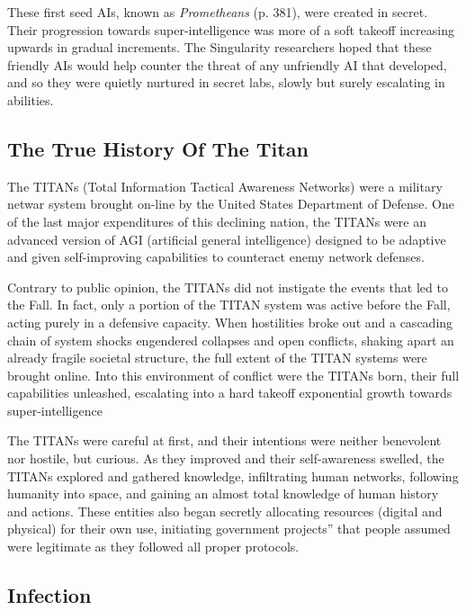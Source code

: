 These first seed AIs, known as \textit{Prometheans } (p. 381), were created in secret. Their progression towards super-intelligence was more of a soft takeoff increasing upwards in gradual increments. The Singularity researchers hoped that these friendly AIs would help counter the threat of any unfriendly AI that developed, and so they were quietly nurtured in secret labs, slowly but surely escalating in abilities. 

\subsection{The True History Of The Titan} 

The TITANs (Total Information Tactical Awareness Networks) were a military netwar system brought on-line by the United States Department of Defense. One of the last major expenditures of this declining nation, the TITANs were an advanced version of AGI (artificial general intelligence) designed to be adaptive and given self-improving capabilities to counteract enemy network defenses. 

Contrary to public opinion, the TITANs did not instigate the events that led to the Fall. In fact, only a portion of the TITAN system was active before the Fall, acting purely in a defensive capacity. When hostilities broke out and a cascading chain of system shocks engendered collapses and open conflicts, shaking apart an already fragile societal structure, the full extent of the TITAN systems were brought online. Into this environment of conflict were the TITANs born, their full capabilities unleashed, escalating into a hard takeoff exponential growth towards super-intelligence 



The TITANs were careful at first, and their intentions were neither benevolent nor hostile, but curious. As they improved and their self-awareness swelled, the TITANs explored and gathered knowledge, infiltrating human networks, following humanity into space, and gaining an almost total knowledge of human history and actions. These entities also began secretly allocating resources (digital and physical) for their own use, initiating government projects'' that people assumed were legitimate as they followed all proper protocols. 

\subsection{Infection} 

